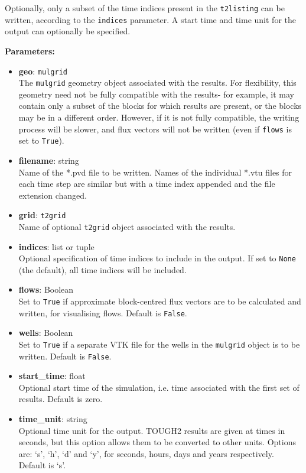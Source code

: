 Optionally, only a subset of the time indices present in the \texttt{t2listing} can be written, according to the \texttt{indices} parameter.  A start time and time unit for the output can optionally be specified.

\textbf{Parameters:}
\begin{itemize}
\item \textbf{geo}: \texttt{mulgrid}\\
  The \texttt{mulgrid} geometry object associated with the results.  For flexibility, this geometry need not be fully compatible with the results- for example, it may contain only a subset of the blocks for which results are present, or the blocks may be in a different order.  However, if it is not fully compatible, the writing process will be slower, and flux vectors will not be written (even if \texttt{flows} is set to \texttt{True}).
\item \textbf{filename}: string\\
  Name of the *.pvd file to be written.  Names of the individual *.vtu files for each time step are similar but with a time index appended and the file extension changed.
\item \textbf{grid}: \texttt{t2grid}\\
  Name of optional \texttt{t2grid} object associated with the results.
\item \textbf{indices}: list or tuple\\
  Optional specification of time indices to include in the output.  If set to \texttt{None} (the default), all time indices will be included.
\item \textbf{flows}: Boolean\\
  Set to \texttt{True} if approximate block-centred flux vectors are to be calculated and written, for visualising flows.  Default is \texttt{False}.
\item \textbf{wells}: Boolean\\
  Set to \texttt{True} if a separate VTK file for the wells in the \texttt{mulgrid} object is to be written.  Default is \texttt{False}.
\item \textbf{start\_time}: float\\
  Optional start time of the simulation, i.e. time associated with the first set of results.  Default is zero.
\item \textbf{time\_unit}: string\\
  Optional time unit for the output.  TOUGH2 results are given at times in seconds, but this option allows them to be converted to other units.  Options are: `s', `h', `d' and `y', for seconds, hours, days and years respectively.  Default is `s'.
\end{itemize}

